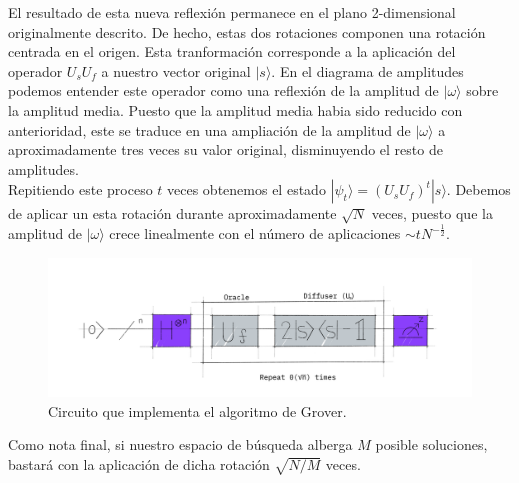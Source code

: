 \documentclass[11pt]{article}
\newcommand{\ra}{\rangle}
\theoremstyle{plain}
\begin{document}
El resultado de esta nueva reflexión permanece en el plano 2-dimensional originalmente descrito. De hecho, estas dos rotaciones componen una rotación centrada en el origen. Esta tranformación corresponde a la aplicación del operador $U_s U_f$ a nuestro vector original $|s\ra$. En el diagrama de amplitudes podemos entender este operador como una reflexión de la amplitud de $|\omega\ra$ sobre la amplitud media. Puesto que la amplitud media habia sido reducido con anterioridad, este se traduce en una ampliación de la amplitud de $|\omega\ra$ a aproximadamente tres veces su valor original, disminuyendo el resto de amplitudes. \\

Repitiendo este proceso $t$ veces obtenemos el estado $|\psi_t\ra = (U_s U_f)^t  |s\ra$. Debemos de aplicar un esta rotación durante aproximadamente $\sqrt N$ veces, puesto que la amplitud de $|\omega\ra$ crece linealmente con el número de aplicaciones $\sim t N^{- \frac{1}{2}}$.

\begin{figure}[H]
	\centering
	\includegraphics[scale=0.5]{figures/grover2}
	\caption{Circuito que implementa el algoritmo de Grover.}
\end{figure}

Como nota final, si nuestro espacio de búsqueda alberga $M$ posible soluciones, bastará con la aplicación de dicha rotación $\sqrt{N / M}$ veces.
\end{document}
